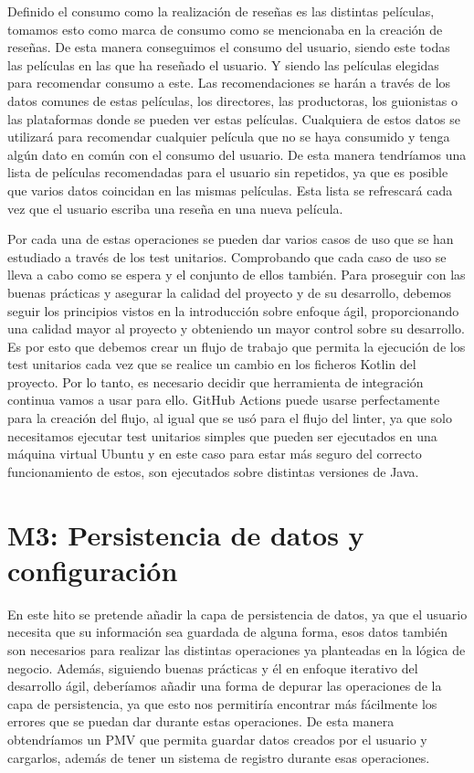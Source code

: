 Definido el consumo como la realización de reseñas es las distintas películas, tomamos esto como marca 
de consumo como se mencionaba en la creación de reseñas. De esta manera conseguimos el consumo del 
usuario, siendo este todas las películas en las que ha reseñado el usuario. Y siendo las películas 
elegidas para recomendar consumo a este. Las recomendaciones se harán a través de los datos comunes de 
estas películas, los directores, las productoras, los guionistas o las plataformas donde se pueden ver 
estas películas. Cualquiera de estos datos se utilizará para recomendar cualquier película que no se 
haya consumido y tenga algún dato en común con el consumo del usuario. De esta manera tendríamos una 
lista de películas recomendadas para el usuario sin repetidos, ya que es posible que varios datos 
coincidan en las mismas películas. Esta lista se refrescará cada vez que el usuario escriba una reseña 
en una nueva película.

Por cada una de estas operaciones se pueden dar varios casos de uso que se han estudiado a través de 
los test unitarios. Comprobando que cada caso de uso se lleva a cabo como se espera y el conjunto de 
ellos también. Para proseguir con las buenas prácticas y asegurar la calidad del proyecto y de su desarrollo, 
debemos seguir los principios vistos en la introducción sobre enfoque ágil, proporcionando una calidad mayor al 
proyecto y obteniendo un mayor control sobre su desarrollo. Es por esto que debemos crear un flujo de trabajo 
que permita la ejecución de los test unitarios cada vez que se realice un cambio en los ficheros Kotlin del 
proyecto. Por lo tanto, es necesario decidir que herramienta de integración continua vamos a usar para ello. 
GitHub Actions puede usarse perfectamente para la creación del flujo, al igual que se usó para el flujo del 
linter, ya que solo necesitamos ejecutar test unitarios simples que pueden ser ejecutados en una máquina virtual 
Ubuntu y en este caso para estar más seguro del correcto funcionamiento de estos, son ejecutados sobre distintas 
versiones de Java.

\section{M3: Persistencia de datos y configuración}

En este hito se pretende añadir la capa de persistencia de datos, ya que el usuario  necesita que su información
sea guardada de alguna forma, esos datos también son necesarios para realizar las distintas operaciones ya 
planteadas en la lógica de negocio. Además, siguiendo buenas prácticas y él en enfoque iterativo del desarrollo 
ágil, deberíamos añadir una forma de depurar las operaciones de la capa de persistencia, ya que esto nos 
permitiría encontrar más fácilmente los errores que se puedan dar durante estas operaciones. De esta manera 
obtendríamos un PMV que permita guardar datos creados por el usuario y cargarlos, además de tener un sistema de 
registro durante esas operaciones.

